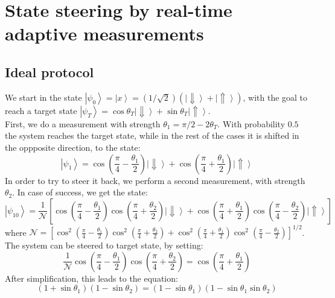 \documentclass[12pt]{article}
\def\ket#1{\left|#1\right>}
\begin{document}
\section{State steering by real-time adaptive measurements}
\subsection{Ideal protocol}
We start in the state $\left| \psi_0 \right \rangle = \ket{x} = (1/\sqrt{2}) \left(\left| \Downarrow \right \rangle + \left| \Uparrow \right \rangle \right)$, with the goal to reach a target state $\left| \psi_T \right \rangle = \cos\theta_T \left| \Downarrow \right \rangle + \sin\theta_T \left| \Uparrow \right \rangle$.\\
First, we do a measurement with strength $\theta_1 = \pi/2-2\theta_T$. With probability $0.5$ the system reaches the target state, while in the rest of the cases it is shifted in the oppposite direction, to the state:
\begin{equation}
\left| \psi_1 \right \rangle = \cos \left( \frac{\pi}{4} - \frac{\theta_1}{2} \right) \left| \Downarrow \right \rangle + \cos \left( \frac{\pi}{4} + \frac{\theta_1}{2} \right) \left| \Uparrow \right \rangle
\end{equation}
In order to try to steer it back, we perform a second measurement, with strength $\theta_2$. In case of success, we get the state:
\begin{equation}
\left| \psi_{10} \right \rangle = \frac{1}{\mathcal{N}} \left[ \cos \left( \frac{\pi}{4} - \frac{\theta_1}{2} \right)\cos \left( \frac{\pi}{4} + \frac{\theta_2}{2} \right) \left| \Downarrow \right \rangle + \cos \left( \frac{\pi}{4} + \frac{\theta_1}{2} \right)\cos \left( \frac{\pi}{4} - \frac{\theta_2}{2} \right) \left| \Uparrow \right \rangle \right]
\end{equation}
where $\mathcal{N} = \left[ \cos^{2} \left( \frac{\pi}{4} - \frac{\theta_1}{2} \right)\cos^2 \left( \frac{\pi}{4} + \frac{\theta_2}{2} \right) + \cos^2 \left( \frac{\pi}{4} + \frac{\theta_1}{2} \right) \cos^2 \left( \frac{\pi}{4} - \frac{\theta_2}{2} \right) \right]^{1/2}$.
The system can be steered to target state, by setting:
\begin{equation}
 \frac{1}{\mathcal{N}} \cos \left( \frac{\pi}{4} - \frac{\theta_1}{2} \right)\cos \left( \frac{\pi}{4} + \frac{\theta_2}{2} \right) = \cos \left( \frac{\pi}{4} + \frac{\theta_1}{2} \right)
\end{equation}
After simplification, this leads to the equation:
\begin{equation}
\left( 1 + \sin \theta_1 \right) \left( 1 - \sin \theta_2 \right) = \left( 1 - \sin \theta_1 \right) \left( 1 - \sin \theta_1 \sin \theta_2 \right)
\end{equation}
\end{document}
